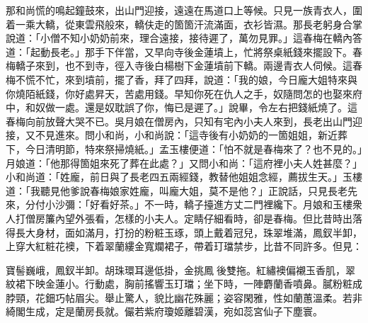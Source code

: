 那和尚慌的鳴起鐘鼓來，出山門迎接，遠遠在馬道口上等候。只見一族青衣人，圍着一乘大轎，從東雲飛般來，轎伕走的箇箇汗流滿面，衣衫皆濕。那長老躬身合掌說道：「小僧不知小奶奶前來，理合遠接，接待遲了，萬勿見罪。」這春梅在轎內答道：「起動長老。」那手下伴當，又早向寺後金蓮墳上，忙將祭桌紙錢來擺設下。春梅轎子來到，也不到寺，徑入寺後白楊樹下金蓮墳前下轎。兩邊青衣人伺候。這春梅不慌不忙，來到墳前，擺了香，拜了四拜，說道：「我的娘，今日龐大姐特來與你燒陌紙錢，你好處昇天，苦處用錢。早知你死在仇人之手，奴隨問怎的也娶來府中，和奴做一處。還是奴耽誤了你，悔已是遲了。」說畢，令左右把錢紙燒了。這春梅向前放聲大哭不已。吳月娘在僧房內，只知有宅內小夫人來到，長老出山門迎接，又不見進來。問小和尚，小和尚說：「這寺後有小奶奶的一箇姐姐，新近葬下，今日清明節，特來祭掃燒紙。」孟玉樓便道：「怕不就是春梅來了？也不見的。」月娘道：「他那得箇姐來死了葬在此處？」又問小和尚：「這府裡小夫人姓甚麼？」小和尚道：「姓龐，前日與了長老四五兩經錢，教替他姐姐念經，薦拔生天。」玉樓道：「我聽見他爹說春梅娘家姓龐，叫龐大姐，莫不是他？」正說話，只見長老先來，分付小沙彌：「好看好茶。」不一時，轎子擡進方丈二門裡纔下。月娘和玉樓衆人打僧房簾內望外張看，怎樣的小夫人。定睛仔細看時，卻是春梅。但比昔時出落得長大身材，面如滿月，打扮的粉粧玉琢，頭上戴着冠兒，珠翠堆滿，鳳釵半卸，上穿大紅粧花襖，下着翠蘭縷金寬斕裙子，帶着玎璫禁步，比昔不同許多。但見：

\begin{myquote}
寶髻巍峨，鳳釵半卸。胡珠環耳邊低掛，金挑鳳𩬆後雙拖。紅繡襖偏襯玉香肌，翠紋裙下映金蓮小。行動處，胸前搖響玉玎璫；坐下時，一陣麝蘭香噴鼻。膩粉粧成脖頸，花鈿巧帖眉尖。舉止驚人，貌比幽花殊麗；姿容閑雅，性如蘭蕙溫柔。若非綺閣生成，定是蘭房長就。{}儼若紫府瓊姬離碧漢，宛如蕊宮仙子下塵寰。
\end{myquote}

